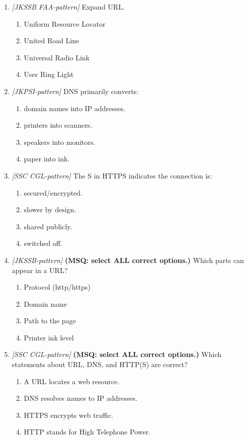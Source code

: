 \documentclass[11pt]{article}
\begin{document}
\begin{enumerate}[label=\textbf{Q\arabic*.}, leftmargin=*]
\item \textit{[JKSSB FAA-pattern]} Expand URL.
  \begin{enumerate}[label=\Alph*.]
    \item Uniform Resource Locator
    \item United Road Line
    \item Universal Radio Link
    \item User Ring Light
  \end{enumerate}
\item \textit{[JKPSI-pattern]} DNS primarily converts:
  \begin{enumerate}[label=\Alph*.]
    \item domain names into IP addresses.
    \item printers into scanners.
    \item speakers into monitors.
    \item paper into ink.
  \end{enumerate}
\item \textit{[SSC CGL-pattern]} The S in HTTPS indicates the connection is:
  \begin{enumerate}[label=\Alph*.]
    \item secured/encrypted.
    \item slower by design.
    \item shared publicly.
    \item switched off.
  \end{enumerate}
\item \textit{[JKSSB-pattern]} \textbf{(MSQ: select ALL correct options.)} Which parts can appear in a URL?
  \begin{enumerate}[label=\Alph*.]
    \item Protocol (http/https)
    \item Domain name
    \item Path to the page
    \item Printer ink level
  \end{enumerate}
\item \textit{[SSC CGL-pattern]} \textbf{(MSQ: select ALL correct options.)} Which statements about URL, DNS, and HTTP(S) are correct?
  \begin{enumerate}[label=\Alph*.]
    \item A URL locates a web resource.
    \item DNS resolves names to IP addresses.
    \item HTTPS encrypts web traffic.
    \item HTTP stands for High Telephone Power.
  \end{enumerate}
\end{enumerate}
\def\JKSSBLessonID{35}\def\JKSSBAnswers{0}
\end{document}
